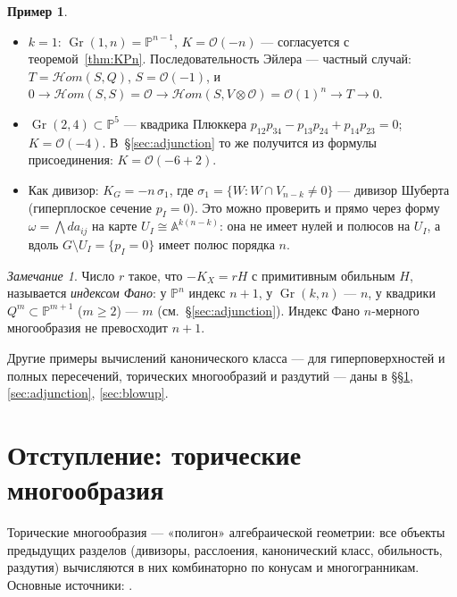 \documentclass[11pt,a4paper]{article}
\theoremstyle{plain}
\theoremstyle{definition}
\newtheorem{example}[theorem]{Пример}
\theoremstyle{remark}
\newtheorem{remark}[theorem]{Замечание}
\newcommand{\PP}{\mathbb{P}}
\newcommand{\A}{\mathbb{A}}
\newcommand{\cO}{\mathcal{O}}
\DeclareMathOperator{\Gr}{Gr}
\begin{document}
\begin{example}
\begin{itemize}
\item $k=1$: $\Gr(1,n)=\PP^{n-1}$, $K=\cO(-n)$ --- согласуется с теоремой~\ref{thm:KPn}.
Последовательность Эйлера --- частный случай: $T=\mathcal Hom(S,Q)$, $S=\cO(-1)$, и
$0\to\mathcal Hom(S,S)=\cO\to\mathcal Hom(S,V\otimes\cO)=\cO(1)^n\to T\to0$.
\item $\Gr(2,4)\subset\PP^5$ --- квадрика Плюккера $p_{12}p_{34}-p_{13}p_{24}+p_{14}p_{23}=0$;
$K=\cO(-4)$. В~\S\ref{sec:adjunction} то же получится из формулы присоединения:
$K=\cO(-6+2)$.
\item Как дивизор: $K_G=-n\,\sigma_1$, где $\sigma_1=\{W:W\cap V_{n-k}\ne0\}$ --- дивизор Шуберта
(гиперплоское сечение $p_I=0$). Это можно проверить и прямо через форму
$\omega=\bigwedge da_{ij}$ на карте $U_I\cong\A^{k(n-k)}$: она не имеет нулей и полюсов на
$U_I$, а вдоль $G\setminus U_I=\{p_I=0\}$ имеет полюс порядка $n$.
\end{itemize}
\end{example}

\begin{remark}
Число $r$ такое, что $-K_X=rH$ с примитивным обильным $H$, называется \emph{индексом Фано}:
у $\PP^n$ индекс $n+1$, у $\Gr(k,n)$ --- $n$, у квадрики $Q^m\subset\PP^{m+1}$ ($m\ge2$) --- $m$
(см.~\S\ref{sec:adjunction}). Индекс Фано $n$-мерного многообразия не превосходит $n+1$.
\end{remark}

Другие примеры вычислений канонического класса --- для гиперповерхностей и полных пересечений,
торических многообразий и раздутий --- даны в \S\S\ref{sec:toric}, \ref{sec:adjunction},
\ref{sec:blowup}.

\section{Отступление: торические многообразия}\label{sec:toric}

Торические многообразия --- «полигон» алгебраической геометрии: все объекты предыдущих
разделов (дивизоры, расслоения, канонический класс, обильность, раздутия) вычисляются в них
комбинаторно по конусам и многогранникам. Основные источники: \cite{CLS,Fu,Da}.

\newcommand{\lat}[1]{\foreach \x in {-#1,...,#1}\foreach \y in {-#1,...,#1}{\fill[gray!75] (\x,\y) circle (1.1pt);}}
\newcommand{\cfill}[5]{\fill[#5] (0,0) -- (10*#1,10*#2) -- (10*#3,10*#4) -- cycle;}
\newcommand{\ray}[2]{\draw[very thick,-{Stealth[length=2.2mm]}] (0,0) -- (#1,#2); \fill (#1,#2) circle (1.5pt);}
\end{document}
